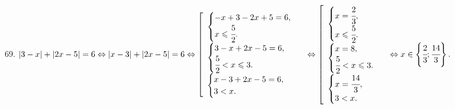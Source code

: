 69. $|3-x|+|2x-5|=6\Leftrightarrow |x-3|+|2x-5|=6\Leftrightarrow \left[\begin{array}{l}\begin{cases} -x+3-2x+5=6,\\ x\leqslant\cfrac{5}{2}.\end{cases}\\
\begin{cases} 3-x+2x-5=6,\\ \cfrac{5}{2}<x\leqslant3.\end{cases}\\ \begin{cases} x-3+2x-5=6,\\ 3<x.\end{cases}\end{array}\right.
\Leftrightarrow \left[\begin{array}{l}\begin{cases} x=\cfrac{2}{3},\\ x\leqslant\cfrac{5}{2}.\end{cases}\\
\begin{cases} x=8,\\ \cfrac{5}{2}<x\leqslant3.\end{cases}\\ \begin{cases} x=\cfrac{14}{3},\\ 3<x.\end{cases}\end{array}\right.
\Leftrightarrow x\in\left\{\cfrac{2}{3};\cfrac{14}{3}\right\}.$\\
